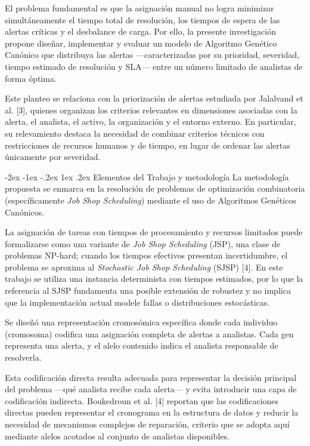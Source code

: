 \documentclass[12pt,a4paper,twocolumn]{article}
\makeatletter
\renewcommand{\section}{\@startsection{section}{1}{\z@}%
  {-2ex \@plus -1ex \@minus -.2ex}%
  {1ex \@plus.2ex}%
  {\fontsize{12}{14}\selectfont\bfseries}}
\makeatother
\begin{document}
El problema fundamental es que la asignación manual no logra minimizar simultáneamente el tiempo total de resolución, los tiempos de espera de las alertas críticas y el desbalance de carga. Por ello, la presente investigación propone diseñar, implementar y evaluar un modelo de Algoritmo Genético Canónico que distribuya las alertas ---caracterizadas por su prioridad, severidad, tiempo estimado de resolución y SLA--- entre un número limitado de analistas de forma óptima.

Este planteo se relaciona con la priorización de alertas estudiada por Jalalvand et al. [3], quienes organizan los criterios relevantes en dimensiones asociadas con la alerta, el analista, el activo, la organización y el entorno externo. En particular, su relevamiento destaca la necesidad de combinar criterios técnicos con restricciones de recursos humanos y de tiempo, en lugar de ordenar las alertas únicamente por severidad.

\section{Elementos del Trabajo y metodología}
La metodología propuesta se enmarca en la resolución de problemas de optimización combinatoria (específicamente \textit{Job Shop Scheduling}) mediante el uso de Algoritmos Genéticos Canónicos.

La asignación de tareas con tiempos de procesamiento y recursos limitados puede formalizarse como una variante de \textit{Job Shop Scheduling} (JSP), una clase de problemas NP-hard; cuando los tiempos efectivos presentan incertidumbre, el problema se aproxima al \textit{Stochastic Job Shop Scheduling} (SJSP) [4]. En este trabajo se utiliza una instancia determinista con tiempos estimados, por lo que la referencia al SJSP fundamenta una posible extensión de robustez y no implica que la implementación actual modele fallas o distribuciones estocásticas.

Se diseñó una representación cromosómica específica donde cada individuo (cromosoma) codifica una asignación completa de alertas a analistas. Cada gen representa una alerta, y el alelo contenido indica el analista responsable de resolverla.

Esta codificación directa resulta adecuada para representar la decisión principal del problema ---qué analista recibe cada alerta--- y evita introducir una capa de codificación indirecta. Boukedroun et al. [4] reportan que las codificaciones directas pueden representar el cronograma en la estructura de datos y reducir la necesidad de mecanismos complejos de reparación, criterio que se adopta aquí mediante alelos acotados al conjunto de analistas disponibles.
\end{document}
